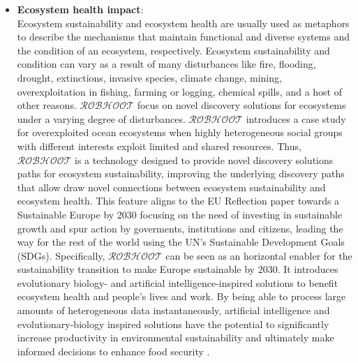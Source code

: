 \documentclass[11pt, a4paper]{article} %
\begin{document}
\begin{itemize}
\item {\bf Ecosystem health impact}:\\
  Ecosystem sustainability and ecosystem health are usually used as
  metaphors to describe the mechanisms that maintain functional and
  diverse systems and the condition of an ecosystem,
  respectively. Ecosystem sustainability and condition can vary as a
  result of many disturbances like fire, flooding, drought,
  extinctions, invasive species, climate change, mining,
  overexploitation in fishing, farming or logging, chemical spills,
  and a host of other reasons. $\mathcal{ROBHOOT}$ focus on novel
  discovery solutions for ecosystems under a varying degree of
  disturbances. $\mathcal{ROBHOOT}$ introduces a case study for
  overexploited ocean ecosystems when highly heterogeneous social
  groups with different interests exploit limited and shared
  resources. Thus, $\mathcal{ROBHOOT}$ is a technology designed to
  provide novel discovery solutions paths for ecosystem
  sustainability, improving the underlying discovery paths that allow
  draw novel connections between ecosystem sustainability and
  ecosystem health. This feature aligns to the EU Reflection paper
  towards a Sustainable Europe by 2030 focusing on the need of
  investing in sustainable growth and spur action by goverments,
  institutions and citizens, leading the way for the rest of the world
  using the UN's Sustainable Development Goals (SDGs). Specifically,
  $\mathcal{ROBHOOT}$ can be seen as an horizontal enabler for the
  sustainability transition to make Europe sustainable by 2030. It
  introduces evolutionary biology- and artificial
  intelligence-inspired solutions to benefit ecosystem health and
  people’s lives and work. By being able to process large amounts of
  heterogeneous data instantaneously, artificial intelligence and
  evolutionary-biology inspired solutions have the potential to
  significantly increase productivity in environmental sustainability
  and ultimately make informed decisions to enhance food security
  \citep{EUcommission}.
  

\end{itemize}
\end{document}

